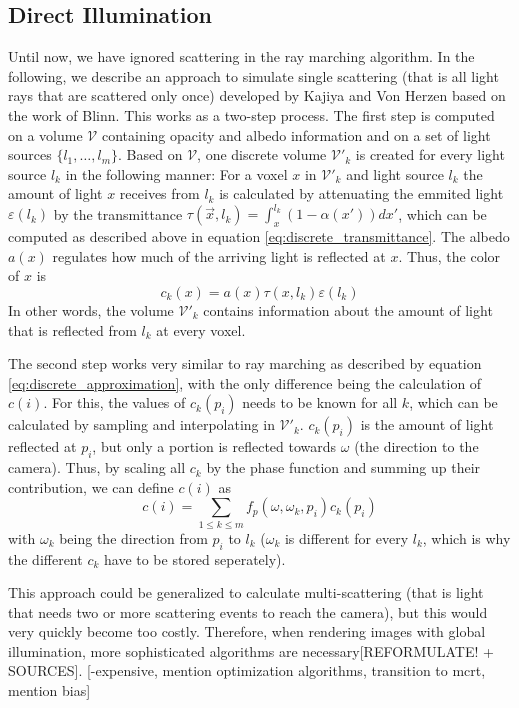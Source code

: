 \subsection{Direct Illumination}\label{subsec:direct_illumination}
Until now, we have ignored scattering in the ray marching algorithm. In the following, we describe an approach to simulate single scattering (that is all light rays that are scattered only once) developed by Kajiya and Von Herzen\cite{10.1145/964965.808594} based on the work of Blinn\cite{10.1145/965145.801255}.
This works as a two-step process.
The first step is computed on a volume $\mathcal{V}$ containing opacity and albedo information and on a set of light sources $\{l_1, \ldots, l_m\}$.
Based on $\mathcal{V}$, one discrete volume $\mathcal{V}'_k$ is created for every light source $l_k$ in the following manner:
For a voxel ${x}$ in $\mathcal{V}'_k$ and light source $l_k$ the amount of light ${x}$ receives from $l_k$ is calculated by attenuating the emmited light $\varepsilon(l_k)$ by the transmittance $\tau(\vec{x}, l_k) = \int_{{x}}^{l_k}(1 - \alpha({x'}))d{x'}$, which can be computed as described above in equation \ref{eq:discrete_transmittance}.
 The albedo $a({x})$ regulates how much of the arriving light is reflected at ${x}$. Thus, the color of ${x}$ is
\begin{equation}
c_k({x}) = a({x}) \tau({x}, l_k) \varepsilon(l_k)
\end{equation}
In other words, the volume $\mathcal{V}'_k$ contains information about the amount of light that is reflected from $l_k$ at every voxel.

The second step works very similar to ray marching as described by equation \ref{eq:discrete_approximation}, with the only difference being the calculation of $c(i)$. For this, the values of $c_k(p_i)$ needs to be known for all $k$, which can be calculated by sampling and interpolating in $\mathcal{V'}_k$.
$c_k(p_i)$ is the amount of light reflected at $p_i$, but only a portion is reflected towards $\omega$ (the direction to the camera). Thus, by scaling all $c_k$ by the phase function and summing up their contribution, we can define $c(i)$ as
\begin{equation}
c(i) = \sum_{1 \le k \le m} f_p(\omega, \omega_k, p_i)c_k(p_i)
\end{equation}
with $\omega_k$ being the direction from $p_i$ to $l_k$ ($\omega_k$ is different for every $l_k$, which is why the different $c_k$ have to be stored seperately).

This approach could be generalized to calculate multi-scattering (that is light that needs two or more scattering events to reach the camera), but this would very quickly become too costly. Therefore, when rendering images with global illumination, more sophisticated algorithms are necessary[REFORMULATE! + SOURCES].
[-expensive, mention optimization algorithms, transition to mcrt, mention bias]









